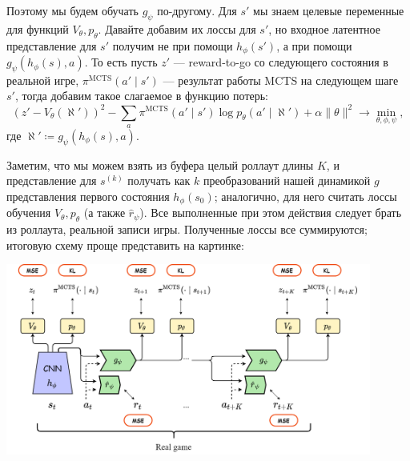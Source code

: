 Поэтому мы будем обучать $g_{\psi}$ по-другому. Для $s'$ мы знаем целевые переменные для функций $V_\theta, p_\theta$. Давайте добавим их лоссы для $s'$, но входное латентное представление для $s'$ получим не при помощи $h_{\phi}(s')$, а при помощи $g_{\psi}(h_{\phi}(s), a)$. То есть пусть $z'$ --- reward-to-go со следующего состояния в реальной игре, $\pi^{\mathrm{MCTS}}(a' \mid s')$ --- результат работы MCTS на следующем шаге $s'$, тогда добавим такое слагаемое в функцию потерь:
\begin{equation}\label{muzero}
(z' - V_\theta(\aleph'))^2 - \sum_a \pi^{\mathrm{MCTS}}(a' \mid s') \log p_\theta(a' \mid \aleph') + \alpha \| \theta \|^2 \to \min_{\theta, \phi, \psi},
\end{equation}
где $\aleph' \coloneqq g_{\psi}(h_{\phi}(s), a)$.

Заметим, что мы можем взять из буфера целый роллаут длины $K$, и представление для $s^{(k)}$ получать как $k$ преобразований нашей динамикой $g$ представления первого состояния $h_{\phi}(s_0)$; аналогично, для него считать лоссы обучения $V_\theta, p_\theta$ (а также $\hat{r}_{\psi}$). Все выполненные при этом действия следует брать из роллаута, реальной записи игры. Полученные лоссы все суммируются; итоговую схему проще представить на картинке:
\begin{center}
    \includegraphics[width=0.9\textwidth]{Images/MuZero.png}
\end{center}

